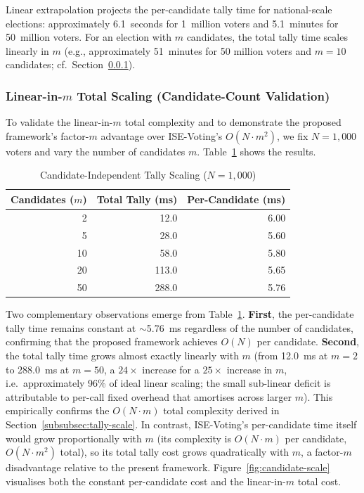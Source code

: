 Linear extrapolation projects the per-candidate tally time for national-scale elections: approximately 6.1~seconds for 1~million voters and 5.1~minutes for 50~million voters. For an election with $m$ candidates, the total tally time scales linearly in $m$ (e.g., approximately 51~minutes for 50 million voters and $m{=}10$ candidates; cf.\ Section~\ref{subsubsec:candidate-scale}).

\subsubsection{Linear-in-$m$ Total Scaling (Candidate-Count Validation)}
\label{subsubsec:candidate-scale}

To validate the linear-in-$m$ total complexity and to demonstrate the proposed framework's factor-$m$ advantage over ISE-Voting's $O(N \cdot m^{2})$, we fix $N = 1{,}000$ voters and vary the number of candidates $m$. Table~\ref{tab:candidate-scale} shows the results.

\begin{table}[H]
\centering
\caption{Candidate-Independent Tally Scaling ($N = 1{,}000$)}
\label{tab:candidate-scale}
\begin{tabular}{|r|r|r|}
\hline
\textbf{Candidates ($m$)} & \textbf{Total Tally (ms)} & \textbf{Per-Candidate (ms)} \\
\hline
2 & 12.0 & 6.00 \\
\hline
5 & 28.0 & 5.60 \\
\hline
10 & 58.0 & 5.80 \\
\hline
20 & 113.0 & 5.65 \\
\hline
50 & 288.0 & 5.76 \\
\hline
\end{tabular}
\end{table}

Two complementary observations emerge from Table~\ref{tab:candidate-scale}. \textbf{First}, the per-candidate tally time remains constant at $\sim$5.76~ms regardless of the number of candidates, confirming that the proposed framework achieves $O(N)$ per candidate. \textbf{Second}, the total tally time grows almost exactly linearly with $m$ (from 12.0~ms at $m=2$ to 288.0~ms at $m=50$, a $24\times$ increase for a $25\times$ increase in $m$, i.e.\ approximately 96\% of ideal linear scaling; the small sub-linear deficit is attributable to per-call fixed overhead that amortises across larger $m$). This empirically confirms the $O(N \cdot m)$ total complexity derived in Section~\ref{subsubsec:tally-scale}. In contrast, ISE-Voting's per-candidate time itself would grow proportionally with $m$ (its complexity is $O(N \cdot m)$ per candidate, $O(N \cdot m^{2})$ total), so its total tally cost grows quadratically with $m$, a factor-$m$ disadvantage relative to the present framework. Figure~\ref{fig:candidate-scale} visualises both the constant per-candidate cost and the linear-in-$m$ total cost.


